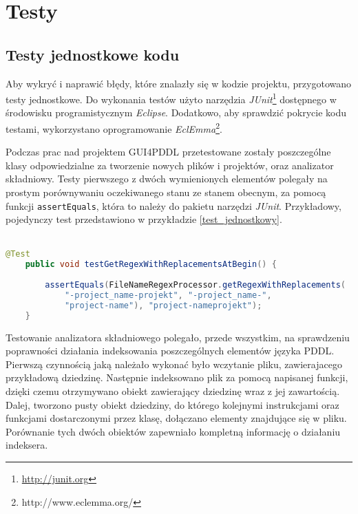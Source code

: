 \chapter{Testy}
\label{sec:testy}

\section{Testy jednostkowe kodu}

Aby wykryć i naprawić błędy, które znalazły się w kodzie projektu, przygotowano testy jednostkowe. Do wykonania testów użyto narzędzia \textit{JUnit}\footnote{\url{http://junit.org}} dostępnego w środowisku programistycznym \textit{Eclipse}. Dodatkowo, aby sprawdzić pokrycie kodu testami, wykorzystano oprogramowanie \textit{EclEmma}\footnote{http://www.eclemma.org/}.

Podczas prac nad projektem GUI4PDDL przetestowane zostały poszczególne klasy odpowiedzialne za tworzenie nowych plików i projektów, oraz analizator składniowy. Testy pierwszego z dwóch wymienionych elementów polegały na prostym porównywaniu oczekiwanego stanu ze stanem obecnym, za pomocą funkcji \texttt{assertEquals}, która to należy do pakietu narzędzi \textit{JUnit}. Przykładowy, pojedynczy test przedstawiono w przykładzie \ref{test_jednostkowy}.\\\\
\begin{Code}
\begin{lstlisting}[language=JAVA,frame=single,label={test_jednostkowy}, caption={Przykładowy test jedostkowy}]
	@Test
	public void testGetRegexWithReplacementsAtBegin() {
		
		assertEquals(FileNameRegexProcessor.getRegexWithReplacements(
			"-project_name-projekt", "-project_name-", 
			"project-name"), "project-nameprojekt");
	}
\end{lstlisting}
\end{Code}


Testowanie analizatora składniowego polegało, przede wszystkim, na sprawdzeniu poprawności działania indeksowania poszczególnych elementów języka PDDL. Pierwszą czynnością jaką należało wykonać było wczytanie pliku, zawierajacego przykładową dziedzinę. Następnie indeksowano plik za pomocą napisanej funkcji, dzięki czemu otrzymywano obiekt zawierający dziedzinę wraz z jej zawartością. Dalej, tworzono pusty obiekt dziedziny, do którego kolejnymi instrukcjami oraz funkcjami dostarczonymi przez klasę, dołączano elementy znajdujące się w pliku. Porównanie tych dwóch obiektów zapewniało kompletną informację o działaniu indeksera.

